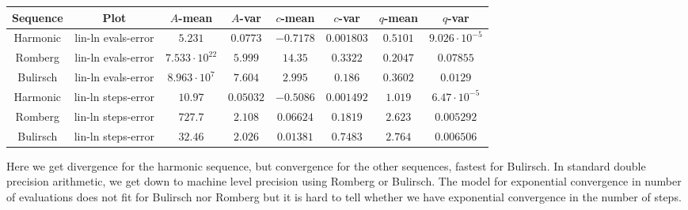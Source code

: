 \begin{table}[H]
    \centering
        \small
    \begin{tabular}{c|c||c|c|c|c|c	|c}
Sequence & Plot & \(A\)-mean & \(A\)-var & \(c\)-mean & \(c\)-var & \(q\)-mean & \(q\)-var\\\hline
\rowcolor{red}
Harmonic & lin-ln evals-error & \(5.231\) & \(0.0773\) & \(-0.7178\) & \(0.001803\) & \(0.5101\) & \(9.026\cdot 10^{-5}\) \\
\rowcolor{red}
Romberg & lin-ln evals-error & \(7.533\cdot 10^{22}\) & \(5.999\) & \(14.35\) & \(0.3322\) & \(0.2047\) & \(0.07855\) \\
\rowcolor{red}
Bulirsch & lin-ln evals-error & \(8.963\cdot 10^{7}\) & \(7.604\) & \(2.995\) & \(0.186\) & \(0.3602\) & \(0.0129\) \\
\rowcolor{red}
Harmonic & lin-ln steps-error & \(10.97\) & \(0.05032\) & \(-0.5086\) & \(0.001492\) & \(1.019\) & \(6.47\cdot 10^{-5}\) \\
\rowcolor{yellow}
Romberg & lin-ln steps-error & \(727.7\) & \(2.108\) & \(0.06624\) & \(0.1819\) & \(2.623\) & \(0.005292\) \\
\rowcolor{yellow}
Bulirsch & lin-ln steps-error & \(32.46\) & \(2.026\) & \(0.01381\) & \(0.7483\) & \(2.764\) & \(0.006506\) \\
    \end{tabular}
    \label{tab:my_label}
\end{table}

Here we get divergence for the harmonic sequence, but convergence for the other sequences, fastest for Bulirsch. In standard double precision arithmetic, we get down to machine level precision using Romberg or Bulirsch. The model for exponential convergence in number of evaluations does not fit for Bulirsch nor Romberg but it is hard to tell whether we have exponential convergence in the number of steps.


